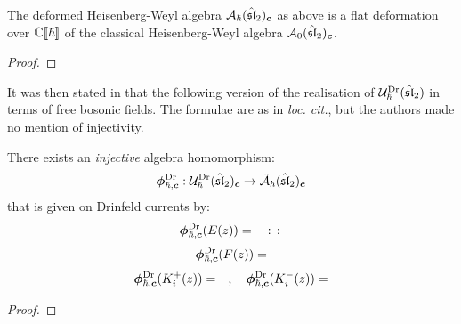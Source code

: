         \begin{proposition} \label{prop: q_deformed_affine_sl_2_heisenberg_weyl_algebra_PBW}
            The deformed Heisenberg-Weyl algebra $\mathcal{A}_{\hbar}(\hat{\mathfrak{sl}}_2)_{\boldsymbol{c}}$ as above is a flat deformation over $\mathbb{C}[\![\hbar]\!]$ of the classical Heisenberg-Weyl algebra $\mathcal{A}_0(\hat{\mathfrak{sl}}_2)_{\boldsymbol{c}}$.
        \end{proposition}
            \begin{proof}
                
            \end{proof}
            
        It was then stated in \cite[Proposition 4]{frenkel_reshetikhin_affine_QUEs_and_deformed_virasoro_and_finite_W_algebras} that the following version of the realisation of $\mathcal{U}_{\hbar}^{\mathrm{Dr}}(\hat{\mathfrak{sl}}_2)$ in terms of free bosonic fields. The formulae are as in \textit{loc. cit.}, but the authors made no mention of injectivity. 
        \begin{proposition} \label{prop: free_boson_realisation_quantum_affine_sl_2_drinfeld_current_presentation_algebra_version}
            There exists an \textit{injective} algebra homomorphism:
                \begin{equation} \label{equation: free_boson_realisation_quantum_affine_sl_2_drinfeld_current_presentation_algebra_version}
                    \boldsymbol{\phi}^{\mathrm{Dr}}_{\hbar, \boldsymbol{c}}: \mathcal{U}_{\hbar}^{\mathrm{Dr}}(\hat{\mathfrak{sl}}_2)_{\boldsymbol{c}} \to \tilde{\mathcal{A}}_{\hbar}(\hat{\mathfrak{sl}}_2)_{\boldsymbol{c}}
                \end{equation}
            that is given on Drinfeld currents by:
                \begin{equation}
                    \boldsymbol{\phi}^{\mathrm{Dr}}_{\hbar, \boldsymbol{c}}( E(z) ) = -\: \mathbf{:} \: {  }  \: \mathbf{:} \:
                \end{equation}
                \begin{equation}
                    \boldsymbol{\phi}^{\mathrm{Dr}}_{\hbar, \boldsymbol{c}}( F(z) ) =
                \end{equation}
                \begin{equation}
                    \boldsymbol{\phi}^{\mathrm{Dr}}_{\hbar, \boldsymbol{c}}( K_i^+(z) ) = \quad, \quad \boldsymbol{\phi}^{\mathrm{Dr}}_{\hbar, \boldsymbol{c}}( K_i^-(z) ) =
                \end{equation}
        \end{proposition}
            \begin{proof}
                
            \end{proof}
